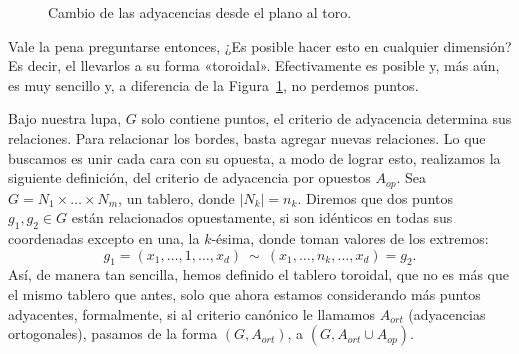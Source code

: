 \begin{figure}[H]
\begin{center}
	\end{center}
	\caption{Cambio de las adyacencias desde el plano al toro.}
	\label{fig:Fig 27} %
\end{figure}

Vale la pena preguntarse entonces, ¿Es posible hacer esto en cualquier dimensión? Es decir, el llevarlos a su forma «toroidal». Efectivamente es posible y, más aún, es muy sencillo y, a diferencia de la Figura~\ref{fig:Fig 27}, no perdemos puntos.

Bajo nuestra lupa, $G$ solo contiene puntos, el criterio de adyacencia determina sus relaciones. Para relacionar los bordes, basta agregar nuevas relaciones. Lo que buscamos es unir cada cara con su opuesta, a modo de lograr esto, realizamos la siguiente definición, del criterio de adyacencia por opuestos $A_{op}$. Sea $G = N_1 \times \dots \times N_m$, un tablero, donde $|N_k| = n_k$. Diremos que dos puntos $g_1,g_2\in G$ están relacionados opuestamente, si son idénticos en todas sus coordenadas excepto en una, la $k$-ésima, donde toman valores de los extremos:
\begin{equation*}
	g_1=(x_1,\dots, 1, \dots, x_d) \ \sim \ (x_1, \dots, n_k, \dots, x_d)=g_2.
\end{equation*}
Así, de manera tan sencilla, hemos definido el tablero toroidal, que no es más que el mismo tablero que antes, solo que ahora estamos considerando más puntos adyacentes, formalmente, si al criterio canónico le llamamos $A_{ort}$ (adyacencias ortogonales), pasamos de la forma $(G,A_{ort})$, a $(G,A_{ort} \cup A_{op})$.

